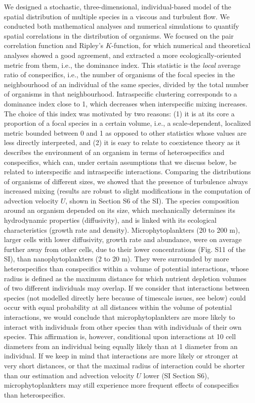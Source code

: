 \documentclass[12pt,english]{article}
\begin{document}
We designed a stochastic, three-dimensional, individual-based model
of the spatial distribution of multiple species in a viscous and turbulent
flow. We conducted both mathematical analyses and numerical simulations
to quantify spatial correlations in the distribution of organisms.
We focused on the pair correlation function and Ripley's $K$-function,
for which numerical and theoretical analyses showed a good agreement,
and extracted a more ecologically-oriented metric from them, i.e.,
the dominance index. This statistic is the \textit{local} average
ratio of conspecifics, i.e., the number of organisms of the focal
species in the neighbourhood of an individual of the same species,
divided by the total number of organisms in that neighbourhood. Intraspecific
clustering corresponds to a dominance index close to 1, which decreases
when interspecific mixing increases. The choice of this index was
motivated by two reasons: (1) it is at its core a proportion of a
focal species in a certain volume, i.e., a scale-dependent, localized metric bounded between 0 and 1 as opposed to other statistics whose values are less directly interpreted, and (2) it is easy to relate to coexistence theory as it describes the environment of an organism
in terms of heterospecifics and conspecifics, which can, under certain
assumptions that we discuss below, be related to interspecific and intraspecific interactions. Comparing the distributions of organisms of different sizes, we showed that the presence of turbulence always increased mixing (results are robust to slight modifications in the
computation of advection velocity $U$, shown in Section S6 of the
SI). The species composition around an organism depended on its size,
which mechanically determines its hydrodynamic properties (diffusivity),
and is linked with its ecological characteristics (growth rate and
density). Microphytoplankters (20 to 200 \textmu m), larger cells
with lower diffusivity, growth rate and abundance, were on average
further away from other cells, due to their lower concentrations (Fig.
S11 of the SI), than nanophytoplankters (2 to 20 \textmu m). They were surrounded by more heterospecifics than conspecifics within
a volume of potential interactions, whose radius is defined as the
maximum distance for which nutrient depletion volumes of two different
individuals may overlap. If we consider that interactions between
species (not modelled directly here because of timescale issues, see
below) could occur with equal probability at all distances within
the volume of potential interactions, we would conclude that microphytoplankters are more likely to interact with individuals from other species than with individuals of their own species. This affirmation is, however, conditional upon interactions at 10 cell diameters from an individual being equally likely than at 1 diameter from an individual. If we
keep in mind that interactions are more likely or stronger at very
short distances, or that the maximal radius of interaction could be shorter than our estimation and advection velocity $U$ lower (SI Section S6), microphytoplankters may still experience more frequent effects of conspecifics than heterospecifics.
\end{document}
